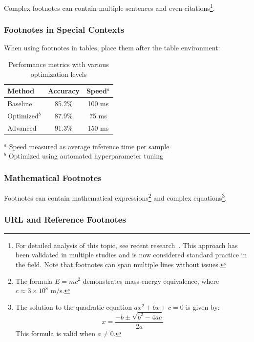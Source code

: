 Complex footnotes can contain multiple sentences and even citations\footnote{For detailed analysis of this topic, see recent research~\cite{sample_reference_2020}. This approach has been validated in multiple studies and is now considered standard practice in the field. Note that footnotes can span multiple lines without issues.}.

\subsubsection{Footnotes in Special Contexts}

When using footnotes in tables, place them after the table environment:

\begin{table}[htbp]
    \centering
    \caption{Performance metrics with various optimization levels}
    \label{tab:footnote_example}
    \begin{tabular}{lcc}
        \toprule
        Method        & Accuracy & Speed$^a$ \\
        \midrule
        Baseline      & 85.2\%   & 100 ms    \\
        Optimized$^b$ & 87.9\%   & 75 ms     \\
        Advanced      & 91.3\%   & 150 ms    \\
        \bottomrule
    \end{tabular}

    \vspace{0.5em}
    \footnotesize
    $^a$ Speed measured as average inference time per sample\\
    $^b$ Optimized using automated hyperparameter tuning
\end{table}

\subsubsection{Mathematical Footnotes}

Footnotes can contain mathematical expressions\footnote{The formula $E = mc^2$ demonstrates mass-energy equivalence, where $c \approx 3 \times 10^8$ m/s.} and complex equations\footnote{The solution to the quadratic equation $ax^2 + bx + c = 0$ is given by:
    $$x = \frac{-b \pm \sqrt{b^2 - 4ac}}{2a}$$
    This formula is valid when $a \neq 0$.}.

\subsubsection{URL and Reference Footnotes}

